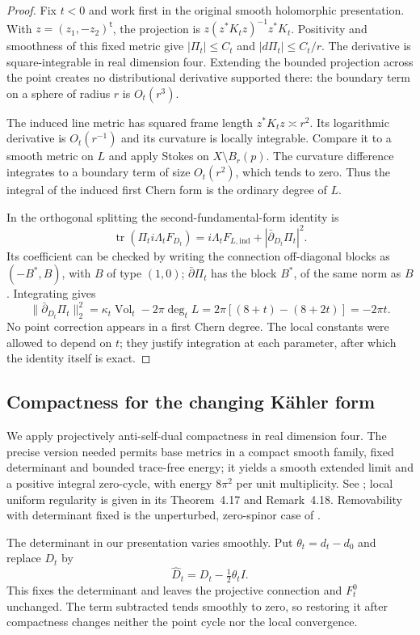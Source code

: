 \documentclass[11pt]{amsart}
\theoremstyle{definition}
\theoremstyle{remark}
\newcommand{\db}{\bar\partial}
\newcommand{\tr}{\operatorname{tr}}
\newcommand{\Vol}{\operatorname{Vol}}
\begin{document}
\begin{proof}
Fix $t<0$ and work first in the original smooth holomorphic presentation.
With $z=(z_1,-z_2)^{\mathsf t}$, the projection is
$z(z^*K_tz)^{-1}z^*K_t$. Positivity and smoothness of this fixed metric
give $|\Pi_t|\le C_t$ and $|d\Pi_t|\le C_t/r$. The derivative is
square-integrable in real dimension four. Extending the bounded projection
across the point creates no distributional derivative supported there:
the boundary term on a sphere of radius $r$ is $O_t(r^3)$.

The induced line metric has squared frame length $z^*K_tz\asymp r^2$.
Its logarithmic derivative is $O_t(r^{-1})$ and its curvature is locally
integrable. Compare it to a smooth metric on $L$ and apply Stokes on
$X\setminus B_r(p)$. The curvature difference integrates to a boundary
term of size $O_t(r^2)$, which tends to zero. Thus the integral of the
induced first Chern form is the ordinary degree of $L$.

In the orthogonal splitting the second-fundamental-form identity is
\[
 \tr(\Pi_t i\Lambda_tF_{D_t})
 =i\Lambda_tF_{L,\mathrm{ind}}+|\db_{D_t}\Pi_t|^2.
\]
Its coefficient can be checked by writing the connection off-diagonal
blocks as $(-B^*,B)$, with $B$ of type $(1,0)$; $\db\Pi_t$ has the
block $B^*$, of the same norm as $B$. Integrating gives
\[
 \|\db_{D_t}\Pi_t\|_2^2
 =\kappa_t\Vol_t-2\pi\deg_tL
 =2\pi[(8+t)-(8+2t)]=-2\pi t.
\]
No point correction appears in a first Chern degree. The local constants
were allowed to depend on $t$; they justify integration at each parameter,
after which the identity itself is exact.
\end{proof}

\subsection{Compactness for the changing K\"ahler form}
We apply projectively anti-self-dual compactness in real dimension four.
The precise version needed permits base metrics in a compact smooth family,
fixed determinant and bounded trace-free energy; it yields a smooth
extended limit and a positive integral zero-cycle, with energy $8\pi^2$
per unit multiplicity. See \cite[\S2.3]{feehanleness1999}; local uniform
regularity is given in its Theorem~4.17 and Remark~4.18. Removability
with determinant fixed is the unperturbed, zero-spinor case of
\cite[Theorem~4.10]{feehanleness1998}.

The determinant in our presentation varies smoothly. Put
$\theta_t=d_t-d_0$ and replace $D_t$ by
\[
 \widehat D_t=D_t-\tfrac12\theta_t I.
\]
This fixes the determinant and leaves the projective connection and
$F_t^0$ unchanged. The term subtracted tends smoothly to zero, so restoring
it after compactness changes neither the point cycle nor the local
convergence.
\end{document}

